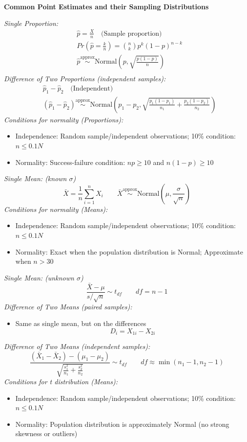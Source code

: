 \textbf{Common Point Estimates and their Sampling Distributions}

\textit{Single Proportion:}
\begin{align*}
    &\hat{p} = \frac{X}{n} \quad \text{(Sample proportion)} \\
    &Pr\left(\hat{p}=\frac{k}{n}\right) = \binom{n}{k} p^k (1-p)^{n-k} \\
    &\hat{p} \stackrel{\text{approx}}{\sim} \text{Normal}\left(p, \sqrt{\frac{p(1-p)}{n}}\right) \\
\end{align*}
\textit{Difference of Two Proportions (independent samples):}
\begin{align*}
    &\hat{p}_1 - \hat{p}_2 \quad \text{(Independent)} \\
    &(\hat{p}_1 - \hat{p}_2) \stackrel{\text{approx}}{\sim} \text{Normal}\left(p_1 - p_2, \sqrt{\frac{p_1(1-p_1)}{n_1} + \frac{p_2(1-p_2)}{n_2}}\right)
\end{align*}
\textit{Conditions for normality (Proportions):}
\begin{itemize} 
    \item Independence: Random sample/independent observations; 10\% condition: $n \leq 0.1N$
    \item Normality: Success-failure condition: $np \ge 10$ and $n(1-p) \ge 10$
\end{itemize}



\textit{Single Mean: (known $\sigma$)}
\[\bar{X} = \frac{1}{n} \sum_{i=1}^{n} X_i \qquad \bar{X} \stackrel{\text{approx}}{\sim} \text{Normal}\left(\mu, \frac{\sigma}{\sqrt{n}}\right)\]
\textit{Conditions for normality (Means):}
\begin{itemize} 
    \item Independence: Random sample/independent observations; 10\% condition: $n \leq 0.1N$
    \item Normality: Exact when the population distribution is Normal; Approximate when $n>30$
\end{itemize}
\textit{Single Mean: (unknown $\sigma$)}
\[
    \frac{\bar{X}-\mu}{s/\sqrt{n}} \sim t_{df} \qquad
    df = n - 1
\]
\textit{Difference of Two Means (paired samples):}
\begin{itemize}
    \item Same as single mean, but on the differences \[D_i = X_{1i} - X_{2i}\]
\end{itemize}
\textit{Difference of Two Means (independent samples):}
\[
    \frac{(\bar{X}_1 - \bar{X}_2) - (\mu_1 - \mu_2)}{\sqrt{\frac{s_1^2}{n_1} + \frac{s_2^2}{n_2}}} \sim t_{df} \qquad df \approx \min(n_1 - 1, n_2 - 1)
\]
\textit{Conditions for t distribution (Means):}
\begin{itemize} 
    \item Independence: Random sample/independent observations; 10\% condition: $n \leq 0.1N$
    \item Normality: Population distribution is approximately Normal (no strong skewness or outliers)
\end{itemize}

